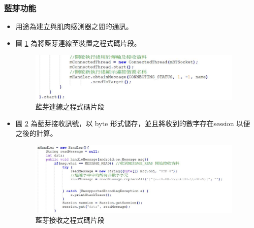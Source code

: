 \documentclass[12pt]{article}  %
\theoremstyle{plain}
\begin{document}
\subsubsection{藍芽功能}
\begin{itemize}
\item 用途為建立與肌肉感測器之間的通訊。
\item 圖 \ref{藍芽連線之程式碼片段} 為將藍芽連線至裝置之程式碼片段。
\begin{figure}[htbp]
\centering
\includegraphics[width=15cm]{pic/ch2/code-BluetoothActivity.JPG}
\caption{藍芽連線之程式碼片段} \label{藍芽連線之程式碼片段}
\end{figure}

\item 圖 \ref{藍芽接收之程式碼片段} 為藍芽接收訊號，以 byte 形式儲存，並且將收到的數字存在session 以便之後的計算。
\begin{figure}[htbp]
\centering
\includegraphics[width=15cm]{pic/ch2/code-BluetoothActivity2.JPG}
\caption{藍芽接收之程式碼片段} \label{藍芽接收之程式碼片段}
\end{figure}
\end{itemize}
\end{document}
